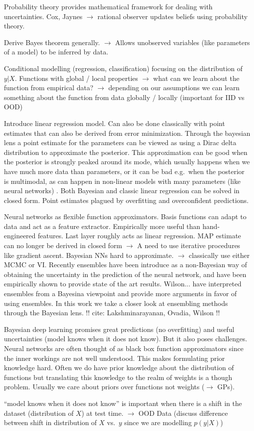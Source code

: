 \documentclass[../thesis.tex]{subfiles}
\begin{document}
Probability theory provides mathematical framework for dealing with uncertainties. Cox, Jaynes $\rightarrow$ rational observer updates beliefs using probability theory.
\bigskip

Derive Bayes theorem generally. $\rightarrow$ Allows unobserved variables (like parameters of a model) to be inferred by data.
\bigskip

Conditional modelling (regression, classification) focusing on the distribution of $y|X$. Functions with global / local properties $\rightarrow$ what can we learn about the function from empirical data? $\rightarrow$ depending on our assumptions we can learn something about the function from data globally / locally (important for IID vs OOD)
\bigskip

Introduce linear regression model. Can also be done classically with point estimates that can also be derived from error minimization. Through the bayesian lens a point estimate for the parameters can be viewed as using a Dirac delta distribution to approximate the posterior. This approximation can be good when the posterior is strongly peaked around its mode, which usually happens when we have much more data than parameters, or it can be bad e.g.\ when the posterior is multimodal, as can happen in non-linear models with many parameters (like neural networks) . Both Bayesian and classic linear regression can be solved in closed form. Point estimates plagued by overfitting and overconfident predictions.
\bigskip

Neural networks as flexible function approximators. Basis functions can adapt to data and act as a feature extractor. Empirically more useful than hand-engineered features. Last layer roughly acts as linear regression. MAP estimate can no longer be derived in closed form $\rightarrow$ A need to use iterative procedures like gradient ascent. Bayesian NNs hard to approximate. $\rightarrow$ classically use either MCMC or VI. Recently ensembles have been introduce as a non-Bayesian way of obtaining the uncertainty in the prediction of the neural network, and have been empirically shown to provide state of the art results. Wilson... have interpreted ensembles from a Bayesina viewpoint and provide more arguments in favor of using ensembles. In this work we take a closer look at ensembling methods through the Bayesian lens. !! cite: Lakshminarayanan, Ovadia, Wilson !!
\bigskip

Bayesian deep learning promises great predictions (no overfitting) and useful uncertainties (model knows when it does not know). But it also poses challenges. Neural networks are often thought of as black box function approximators since the inner workings are not well understood. This makes formulating prior knowledge hard. Often we do have prior knowledge about the distribution of functions but translating this knowledge to the realm of weights is a though problem. Usually we care about priors over functions not weights ($\rightarrow$ GPs). 

``model knows when it does not know'' is important when there is a shift in the dataset (distribution of $X$) at test time. $\rightarrow$ OOD Data (discuss difference between shift in distribution of $X$ vs.\ $y$ since we are modelling $p(y|X)$)
\end{document}
